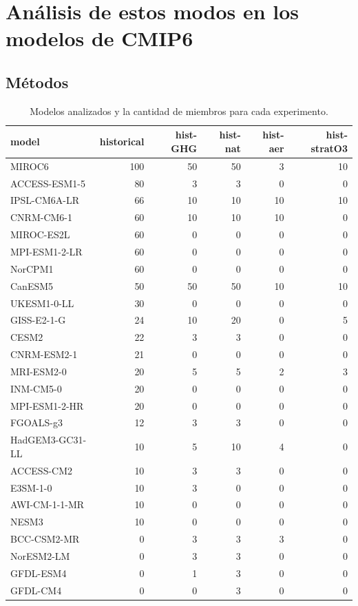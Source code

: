 \documentclass[12pt,oneside]{reedthesis}
\begin{document}
\hypertarget{anuxe1lisis-de-estos-modos-en-los-modelos-de-cmip6}{%
\section{Análisis de estos modos en los modelos de CMIP6}\label{anuxe1lisis-de-estos-modos-en-los-modelos-de-cmip6}}

\hypertarget{muxe9todos}{%
\subsection{Métodos}\label{muxe9todos}}

\begin{table}

\caption{\label{tab:modelos}Modelos analizados y la cantidad de miembros para cada experimento.}
\centering
\begin{tabular}[t]{l|r|r|r|r|r}
\hline
model & historical & hist-GHG & hist-nat & hist-aer & hist-stratO3\\
\hline
MIROC6 & 100 & 50 & 50 & 3 & 10\\
\hline
ACCESS-ESM1-5 & 80 & 3 & 3 & 0 & 0\\
\hline
IPSL-CM6A-LR & 66 & 10 & 10 & 10 & 10\\
\hline
CNRM-CM6-1 & 60 & 10 & 10 & 10 & 0\\
\hline
MIROC-ES2L & 60 & 0 & 0 & 0 & 0\\
\hline
MPI-ESM1-2-LR & 60 & 0 & 0 & 0 & 0\\
\hline
NorCPM1 & 60 & 0 & 0 & 0 & 0\\
\hline
CanESM5 & 50 & 50 & 50 & 10 & 10\\
\hline
UKESM1-0-LL & 30 & 0 & 0 & 0 & 0\\
\hline
GISS-E2-1-G & 24 & 10 & 20 & 0 & 5\\
\hline
CESM2 & 22 & 3 & 3 & 0 & 0\\
\hline
CNRM-ESM2-1 & 21 & 0 & 0 & 0 & 0\\
\hline
MRI-ESM2-0 & 20 & 5 & 5 & 2 & 3\\
\hline
INM-CM5-0 & 20 & 0 & 0 & 0 & 0\\
\hline
MPI-ESM1-2-HR & 20 & 0 & 0 & 0 & 0\\
\hline
FGOALS-g3 & 12 & 3 & 3 & 0 & 0\\
\hline
HadGEM3-GC31-LL & 10 & 5 & 10 & 4 & 0\\
\hline
ACCESS-CM2 & 10 & 3 & 3 & 0 & 0\\
\hline
E3SM-1-0 & 10 & 3 & 0 & 0 & 0\\
\hline
AWI-CM-1-1-MR & 10 & 0 & 0 & 0 & 0\\
\hline
NESM3 & 10 & 0 & 0 & 0 & 0\\
\hline
BCC-CSM2-MR & 0 & 3 & 3 & 3 & 0\\
\hline
NorESM2-LM & 0 & 3 & 3 & 0 & 0\\
\hline
GFDL-ESM4 & 0 & 1 & 3 & 0 & 0\\
\hline
GFDL-CM4 & 0 & 0 & 3 & 0 & 0\\
\hline
\end{tabular}
\end{table}
\end{document}
